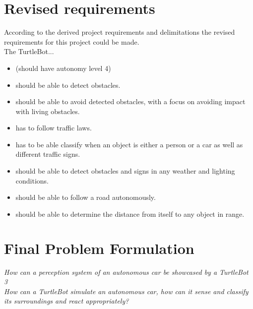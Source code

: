 \section{Revised requirements}
 
According to the derived project requirements and delimitations the revised requirements for this project could be made.\\
The TurtleBot...
 
\begin{itemize}

\item (should have autonomy level 4)

\item should be able to detect obstacles.

\item should be able to avoid detected obstacles, with a focus on avoiding impact with living obstacles.

\item has to follow traffic laws.

\item has to be able classify when an object is either a person or a car as well as different traffic signs.

\item should be able to detect obstacles and signs in any weather and lighting conditions.

\item should be able to follow a road autonomously.

\item should be able to determine the distance from itself to any object in range. 


\end{itemize}




\section{Final Problem Formulation}
\textit{How can a perception system of an autonomous car be showcased by a TurtleBot 3}
\\
\textit{How can a TurtleBot simulate an autonomous car, how can it sense and classify its surroundings and react appropriately?}
